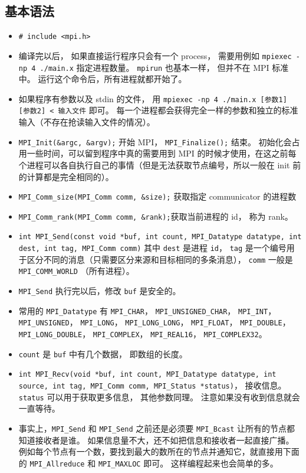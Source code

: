 \subsection{基本语法}
\begin{itemize}
\item \verb`# include <mpi.h>`
\item 编译完以后， 如果直接运行程序只会有一个 process， 需要用例如 \verb`mpiexec -np 4 ./main.x` 指定进程数量。 \verb`mpirun` 也基本一样， 但并不在 MPI 标准中。 运行这个命令后，所有进程就都开始了。
\item 如果程序有参数以及 stdin 的文件， 用 \verb`mpiexec -np 4 ./main.x [参数1] [参数2] < 输入文件` 即可。 每一个进程都会获得完全一样的参数和独立的标准输入（不存在抢读输入文件的情况）。
\item \verb`MPI_Init(&argc, &argv);` 开始 MPI， \verb`MPI_Finalize();` 结束。 初始化会占用一些时间，可以留到程序中真的需要用到 MPI 的时候才使用，在这之前每个进程可以各自执行自己的事情（但是无法获取节点编号，所以一般在 init 前的计算都是完全相同的）。
\item \verb`MPI_Comm_size(MPI_Comm comm, &size);` 获取指定 communicator 的进程数
\item \verb`MPI_Comm_rank(MPI_Comm comm, &rank);`获取当前进程的 id， 称为 rank。
\item \verb`int MPI_Send(const void *buf, int count, MPI_Datatype datatype, int dest, int tag, MPI_Comm comm)` 其中 \verb`dest` 是进程 \verb`id`， \verb`tag` 是一个编号用于区分不同的消息（只需要区分来源和目标相同的多条消息）， \verb`comm` 一般是 \verb`MPI_COMM_WORLD` （所有进程）。
\item \verb`MPI_Send` 执行完以后，修改 \verb`buf` 是安全的。
\item 常用的 \verb`MPI_Datatype` 有 \verb`MPI_CHAR`， \verb`MPI_UNSIGNED_CHAR`， \verb`MPI_INT`， \verb`MPI_UNSIGNED`， \verb`MPI_LONG`， \verb`MPI_LONG_LONG`， \verb`MPI_FLOAT`， \verb`MPI_DOUBLE`， \verb`MPI_LONG_DOUBLE`， \verb`MPI_COMPLEX`， \verb`MPI_REAL16`， \verb`MPI_COMPLEX32`。
\item \verb`count` 是 \verb`buf` 中有几个数据， 即数组的长度。
\item \verb`int MPI_Recv(void *buf, int count, MPI_Datatype datatype, int source, int tag, MPI_Comm comm, MPI_Status *status)`， 接收信息。 \verb`status` 可以用于获取更多信息， 其他参数同理。 注意如果没有收到信息就会一直等待。
\item 事实上，\verb`MPI_Send` 和 \verb`MPI_Send` 之前还是必须要 \verb`MPI_Bcast` 让所有的节点都知道接收者是谁。 如果信息量不大，还不如把信息和接收者一起直接广播。例如每个节点有一个数，要找到最大的数所在的节点并通知它，就直接用下面的 \verb`MPI_Allreduce` 和 \verb`MPI_MAXLOC` 即可。 这样编程起来也会简单的多。

\end{itemize}
